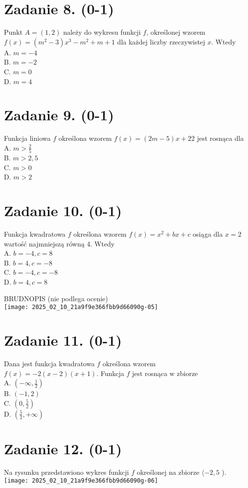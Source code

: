 \documentclass[10pt]{article}
\begin{document}
\section*{Zadanie 8. (0-1)}
Punkt \(A=(1,2)\) należy do wykresu funkcji \(f\), określonej wzorem \(f(x)=\left(m^{2}-3\right) x^{3}-m^{2}+m+1\) dla każdej liczby rzeczywistej \(x\). Wtedy\\
A. \(m=-4\)\\
B. \(m=-2\)\\
C. \(m=0\)\\
D. \(m=4\)

\section*{Zadanie 9. (0-1)}
Funkcja liniowa \(f\) określona wzorem \(f(x)=(2 m-5) x+22\) jest rosnąca dla\\
A. \(m>\frac{2}{5}\)\\
B. \(m>2,5\)\\
C. \(m>0\)\\
D. \(m>2\)

\section*{Zadanie 10. (0-1)}
Funkcja kwadratowa \(f\) określona wzorem \(f(x)=x^{2}+b x+c\) osiąga dla \(x=2\) wartość najmniejszą równą 4. Wtedy\\
A. \(b=-4, c=8\)\\
B. \(b=4, c=-8\)\\
C. \(b=-4, c=-8\)\\
D. \(b=4, c=8\)

BRUDNOPIS (nie podlega ocenie)\\
\texttt{[image: 2025\_02\_10\_21a9f9e366fbb9d66090g-05]}

\section*{Zadanie 11. (0-1)}
Dana jest funkcja kwadratowa \(f\) określona wzorem \(f(x)=-2(x-2)(x+1)\). Funkcja \(f\) jest rosnąca w zbiorze\\
A. \(\left(-\infty, \frac{1}{2}\right)\)\\
B. \((-1,2)\)\\
C. \(\left(0, \frac{5}{2}\right)\)\\
D. \(\left(\frac{5}{2},+\infty\right)\)

\section*{Zadanie 12. (0-1)}
Na rysunku przedstawiono wykres funkcji \(f\) określonej na zbiorze \(\langle-2,5\) ).\\
\texttt{[image: 2025\_02\_10\_21a9f9e366fbb9d66090g-06]}
\end{document}
